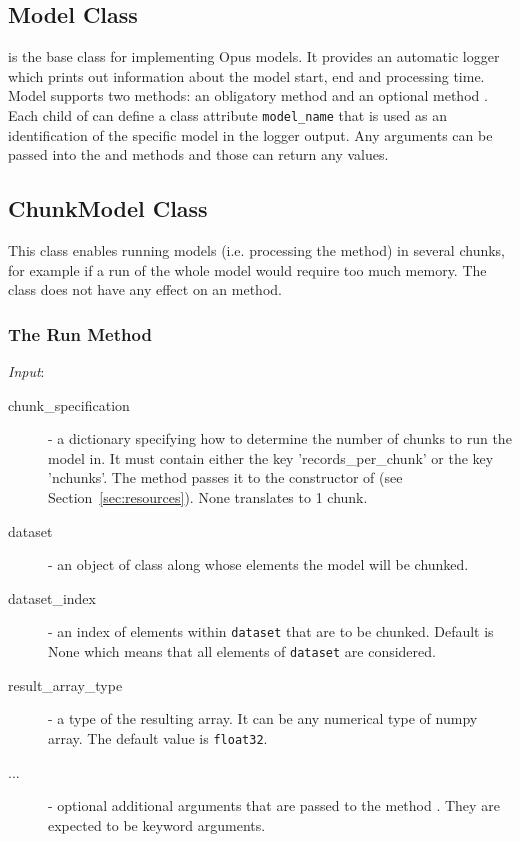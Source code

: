 \subsection{Model Class}
 is the base class for implementing Opus models. It provides an
automatic logger which prints out information about the model start, end and
processing time.  Model supports two methods: an obligatory method
 and an optional method . Each child of
 can define a class attribute \verb|model_name| that is used as
an identification of the specific model in the logger output. Any arguments
can be passed into the  and  methods and
those can return any values.

\subsection{ChunkModel Class}
\label{sec:chunk-model} 

This class enables running models (i.e. processing the  method) in
several chunks, for example if a run of the whole model would require too much
memory. The class does not have any effect on an  method.

\subsubsection{The Run Method}
{\it Input}:
\begin{description}
\item[chunk_specification] - a dictionary specifying how to determine the number
  of chunks to run the model in. It must contain either the key 'records_per_chunk'
  or the key 'nchunks'. The method passes it to the constructor of  
  (see Section~\ref{sec:resources}). None translates to 1 chunk. 
\item[dataset] - an object of class  along whose elements the
  model will be chunked.
\item[dataset_index] - an index of elements within \verb|dataset| that are to
  be chunked. Default is None which means that all elements of \verb|dataset| are considered.
\item[result_array_type] - a type of the resulting array. It can be any numerical type of numpy array.
        The default value is \verb|float32|.
\item[...] - optional additional arguments that are passed to the method
  . They are expected to be keyword arguments.
\end{description}


